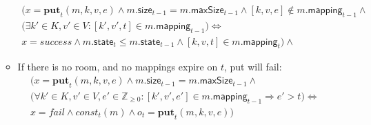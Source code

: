 \documentclass{article}
\renewcommand{\o}[1]{\ensuremath{\mathbf{#1}}}
\newcommand{\p}[1]{\ensuremath{\mathit{#1}}}
\newcommand{\s}[1]{\ensuremath{\mathsf{#1}}}
\newcommand{\nintset}{\ensuremath{\mathds{Z}_{\ge 0}}}
\begin{document}
\begin{itemize}
\begin{itemize}
    \begin{gather}
      \Big(x=\o{put}_t(m, k, v, e) \wedge m.\s{size}_{t-1} = m.\s{maxSize}_{t-1} \wedge [k, v, e] \not\in m.\s{mapping}_{t-1} \wedge \nonumber\\
      \big(\exists k'\in K, v'\in V: [k', v', t] \in m.\s{mapping}_{t-1}\big) \Leftrightarrow\nonumber\\
      x=success \wedge m.\s{state}_t \le m.\s{state}_{t-1} \wedge [k, v, t] \in m.\s{mapping}_t\Big)\wedge
      \label{eq:put4}
    \end{gather}
  \item If there is no room, and no mappings expire on $t$, put will fail:
    \begin{gather}
      \Big(x=\o{put}_t(m, k, v, e) \wedge m.\s{size}_{t-1} = m.\s{maxSize}_{t-1} \wedge \nonumber\\
      \big(\forall k'\in K, v'\in V, e' \in \nintset: [k', v', e'] \in m.\s{mapping}_{t-1} \Rightarrow e' > t \big) \Leftrightarrow\nonumber\\
      x=fail \wedge \p{const}_t(m) \wedge o_t = \o{put}_t(m,k,v,e)\Big)
      \label{eq:put5}
    \end{gather}
  \end{itemize}

\end{itemize}
\end{document}
